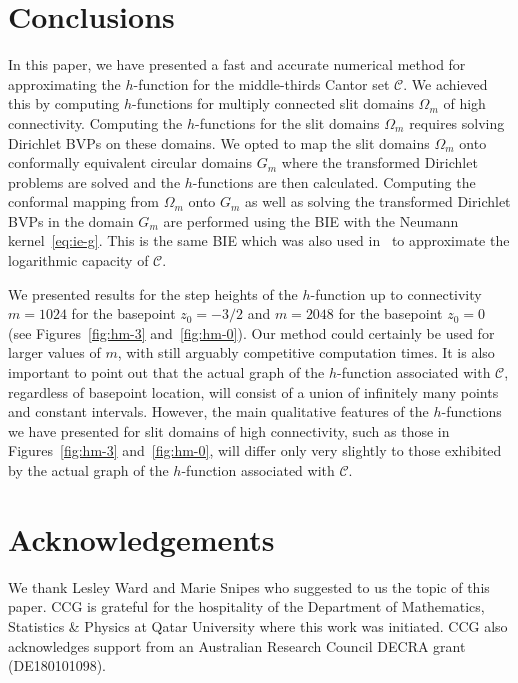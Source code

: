 \section{Conclusions}\label{sec:con}

In this paper, we have presented a fast and accurate numerical method for approximating the $h$-function for the middle-thirds Cantor set $\mathcal{C}$. We achieved this by computing $h$-functions for multiply connected slit domains $\Omega_m$ of high connectivity. Computing the $h$-functions for the slit domains $\Omega_m$ requires solving Dirichlet BVPs on these domains. 
We opted to map the slit domains $\Omega_m$ onto conformally equivalent circular domains $G_m$ where the transformed Dirichlet problems are solved and the $h$-functions are then calculated. 
Computing the conformal mapping from $\Omega_m$ onto $G_m$ as well as solving the transformed Dirichlet BVPs in the domain $G_m$ are performed using  the BIE with the Neumann kernel~\eqref{eq:ie-g}. 
This is the same BIE which was also used in~\cite{LSN17} to approximate the logarithmic capacity of $\mathcal{C}$.

We presented results for the step heights of the $h$-function up to connectivity $m=1024$ for the basepoint $z_0=-3/2$ and $m=2048$ for the basepoint $z_0=0$ (see Figures~\ref{fig:hm-3} and~\ref{fig:hm-0}). Our method could certainly be used for larger values of $m$, with still arguably competitive computation times. It is also important to point out that the actual graph of the $h$-function associated with $\mathcal{C}$, regardless of basepoint location, will consist of a union of infinitely many points and constant intervals. However, the main qualitative features of the $h$-functions we have presented for slit domains of high connectivity, such as those in Figures~\ref{fig:hm-3} and~\ref{fig:hm-0}, will differ only very slightly to those exhibited by the actual graph of the $h$-function associated with $\mathcal{C}$. 



\section*{Acknowledgements}
We thank Lesley Ward and Marie Snipes who suggested to us the topic of this paper. CCG is grateful for the hospitality of the Department of Mathematics, Statistics \& Physics at Qatar University where this work was initiated. CCG also acknowledges support from an Australian Research Council DECRA grant (DE180101098).

